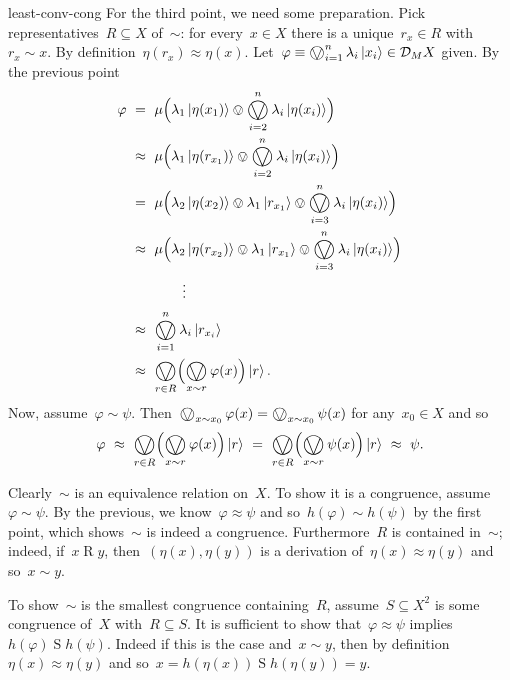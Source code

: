 \begin{solution}{least-conv-cong}
For the third point, we need some preparation.
Pick representatives~$R \subseteq X$ of~$\sim$:
    for every~$x \in X$ there is a unique~$r_x \in R$ with~$r_x\sim x$.
    By definition~$\eta(r_x) \approx \eta(x)$.
    Let~$\varphi \equiv \bigovee^n_{i=1} \lambda_i\ket{x_i}  \in \mathcal{D}_M X$ given.
By the previous point~
\begin{align*}
    \varphi & \ = \ 
    \mu \Bigl( \lambda_1 \ket{\eta(x_1)}  \ovee \bigovee^n_{i=2} \lambda_i\ket{\eta(x_i)}  \Bigr) \\
    & \ \approx \ 
    \mu \Bigl( \lambda_1 \ket{\eta(r_{x_1})}  \ovee \bigovee^n_{i=2} \lambda_i\ket{\eta(x_i)}  \Bigr) \\
    & \ = \ 
    \mu \Bigl( \lambda_2 \ket{\eta(x_2)}  \ovee \lambda_1 \ket{r_{x_1}}  \ovee  \bigovee^n_{i=3} \lambda_i\ket{\eta(x_i)}  \Bigr) \\
    & \ \approx \ 
    \mu \Bigl( \lambda_2 \ket{\eta(r_{x_2})}  \ovee \lambda_1 \ket{r_{x_1}}  \ovee  \bigovee^n_{i=3} \lambda_i\ket{\eta(x_i)}  \Bigr) \\
    & \qquad\qquad  \vdots\\
    & \ \approx \ \bigovee_{i=1}^n \lambda_i \ket{r_{x_i}} \\
    & \ \approx \ \bigovee_{r \in R} \Bigl(\bigovee_{x \sim r} \varphi(x) \Bigr)\ket{r}.
\end{align*}
Now, assume~$\varphi \sim \psi$.
Then~$\bigovee_{x \sim x_0} \varphi(x)
    = \bigovee_{x \sim x_0} \psi(x)$ for any~$x_0 \in X$
        and so
\begin{equation*}
\varphi \ \approx  \ 
                \bigovee_{r \in R} \Bigl( \bigovee_{x \sim r} \varphi(x) \Bigr) \ket{r}
              \ = \  \bigovee_{r \in R} \Bigl( \bigovee_{x \sim r} \psi(x) \Bigr) \ket{r}
            \ \approx \  \psi.
\end{equation*}

Clearly~$\sim$ is an equivalence relation on~$X$.
To show it is a congruence, assume~$\varphi \sim \psi$.
By the previous, we know~$\varphi \approx \psi$
    and so~$h(\varphi) \sim h(\psi)$ by the first point,
        which shows~$\sim$ is indeed a congruence.
Furthermore~$R$ is contained in~$\sim$;
indeed, if~$x \mathrel{R} y$,
    then~$(\eta(x), \eta(y))$ is a derivation of~$\eta(x) \approx \eta(y)$
    and so~$x \sim y$.

To show~$\sim$ is the smallest congruence containing~$R$,
    assume~$S \subseteq X^2$ is some congruence of~$X$
        with~$R \subseteq S$.
It is sufficient to show that~$\varphi \approx \psi$
    implies~$h(\varphi) \mathrel{S} h(\psi)$.
Indeed if this is the case and~$x \sim y$,
    then by definition~$\eta(x) \approx \eta(y)$
    and so~$x = h(\eta(x)) \mathrel{S} h(\eta(y)) = y$.


\end{solution}
